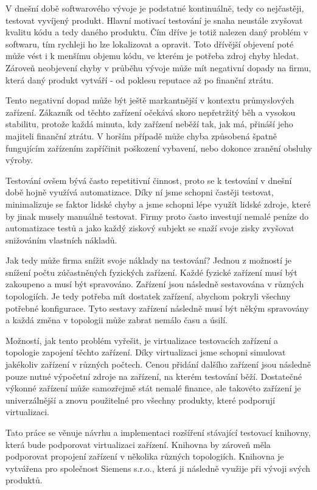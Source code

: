 \begin{introduction}
V dnešní době softwarového vývoje je podstatné kontinuálně, tedy co nejčastěji, testovat vyvíjený produkt. Hlavní motivací testování je snaha neustále zvyšovat kvalitu kódu a tedy daného produktu. Čím dříve je totiž nalezen daný problém v softwaru, tím rychleji ho lze lokalizovat a opravit. Toto dřívější objevení poté může vést i k menšímu objemu kódu, ve kterém je potřeba zdroj chyby hledat. Zároveň neobjevení chyby v průběhu vývoje může mít negativní dopady na firmu, která daný produkt vytváří - od poklesu reputace až po finanční ztrátu.

Tento negativní dopad může být ještě markantnější v kontextu průmyslových zařízení. Zákazník od těchto zařízení očekává skoro nepřetržitý běh a vysokou stabilitu, protože každá minuta, kdy zařízení neběží tak, jak má, přináší jeho majiteli finanční ztrátu. V horším případě může chyba způsobená špatně fungujícím zařízením zapříčinit poškození vybavení, nebo dokonce zranění obsluhy výroby. 

Testování ovšem bývá často repetitivní činnost, proto se k testování v dnešní době hojně využívá automatizace. Díky ní jsme schopni častěji testovat, minimalizuje se faktor lidské chyby a jsme schopni lépe využít lidské zdroje, které by jinak musely manuálně testovat. Firmy proto často investují nemalé peníze do automatizace testů a jako každý ziskový subjekt se snaží svoje zisky zvyšovat snižováním vlastních nákladů. 

Jak tedy může firma snížit svoje náklady na testování? Jednou z možností je snížení počtu zúčastněných fyzických zařízení. Každé fyzické zařízení musí být zakoupeno a musí být spravováno. Zařízení jsou následně sestavována v různých topologiích. Je tedy potřeba mít dostatek zařízení, abychom pokryli všechny potřebné konfigurace. Tyto sestavy zařízení následně musí být někým spravovány a každá změna v topologii může zabrat nemálo času a úsilí.

Možností, jak tento problém vyřešit, je virtualizace testovacích zařízení a topologie zapojení těchto zařízení. Díky virtualizaci jsme schopni simulovat jakékoliv zařízení v různých počtech. Cenou přidání dalšího zařízení jsou následně pouze nutné výpočetní zdroje na zařízení, na kterém testování běží. Dostatečné výkonné zařízení může samozřejmě stát nemalé finance, ale takovéto zařízení je univerzálnější a znovu použitelné pro všechny produkty, které podporují virtualizaci.

Tato práce se věnuje návrhu a implementaci rozšíření stávající testovací knihovny, která bude podporovat virtualizaci zařízení. Knihovna by zároveň měla podporovat propojení zařízení v několika různých topologiích. Knihovna je vytvářena pro společnost Siemens s.r.o., která ji následně využije při vývoji svých produktů. 


\end{introduction}

